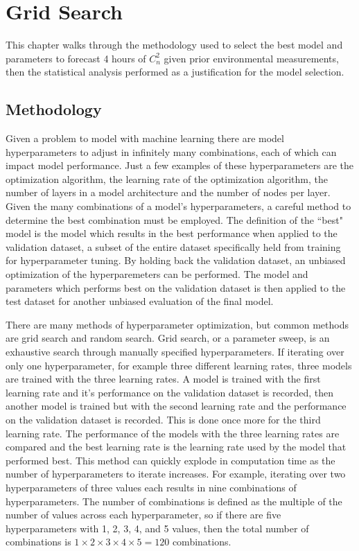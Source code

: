 \chapter{Grid Search}
\label{ch4}
This chapter walks through the methodology used to select the best model and parameters to forecast 4 hours of $C_{n}^{2}$ given prior environmental measurements, then the statistical analysis performed as a justification for the model selection.

\section{Methodology}
Given a problem to model with machine learning there are model hyperparameters to adjust in infinitely many combinations, each of which can impact model performance. Just a few examples of these hyperparameters are the optimization algorithm, the learning rate of the optimization algorithm, the number of layers in a model architecture and the number of nodes per layer. Given the many combinations of a model's hyperparameters, a careful method to determine the best combination must be employed. The definition of the ``best" model is the model which results in the best performance when applied to the validation dataset, a subset of the entire dataset specifically held from training for hyperparameter tuning. By holding back the validation dataset, an unbiased optimization of the hyperparemeters can be performed. The model and parameters which performs best on the validation dataset is then applied to the test dataset for another unbiased evaluation of the final model.

There are many methods of hyperparameter optimization, but common methods are grid search and random search. Grid search, or a parameter sweep, is an exhaustive search through manually specified hyperparameters. If iterating over only one hyperparameter, for example three different learning rates, three models are trained with the three learning rates. A model is trained with the first learning rate and it's performance on the validation dataset is recorded, then another model is trained but with the second learning rate and the performance on the validation dataset is recorded. This is done once more for the third learning rate. The performance of the models with the three learning rates are compared and the best learning rate is the learning rate used by the model that performed best. This method can quickly explode in computation time as the number of hyperparameters to iterate increases. For example, iterating over two hyperparameters of three values each results in nine combinations of hyperparameters. The number of combinations is defined as the multiple of the number of values across each hyperparameter, so if there are five hyperparameters with 1, 2, 3, 4, and 5 values, then the total number of combinations is $1 \times 2 \times 3 \times 4 \times 5 = 120$ combinations.

